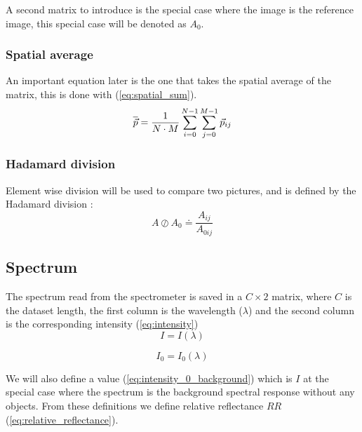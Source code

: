 A second matrix to introduce is the special case where the image is the reference image, this special case will be denoted as $A_0$.

\subsubsection{Spatial average}
\label{sec:spatial_average}

An important equation later is the one that takes the spatial average of the matrix, this is done with (\ref{eq:spatial_sum}).
\begin{equation}
    \label{eq:spatial_sum}
    \overline{\vec{p}} = \frac{1}{N \cdot M} \sum_{i=0}^{N-1} \sum_{j=0}^{M-1} \vec{p}_{ij}
\end{equation}


\subsubsection{Hadamard division}
Element wise division will be used to compare two pictures, and is defined by the Hadamard division \cite{HadamardDivisionInfixed}:
\begin{equation}
    \label{eq:element_wise_division_image}
    A \oslash  A_0 \doteq  \frac{A_{ij}}{A_{0ij} } %
\end{equation}


\subsection{Spectrum}
\label{sec:spectrum}

The spectrum read from the spectrometer is saved in a $C \times 2$ matrix, where $C$ is the dataset length, the first column is the wavelength ($\lambda$) and the second column is the corresponding intensity (\ref{eq:intensity})
\begin{equation}
    \label{eq:intensity}
    I = I(\lambda)    
\end{equation}

\begin{equation}
    \label{eq:intensity_0_background}
    I_0 = I_0(\lambda)
\end{equation}

We will also define a value (\ref{eq:intensity_0_background}) which is $I$ at the special case where the spectrum is the background spectral response without any objects. From these definitions we define relative reflectance $RR$ (\ref{eq:relative_reflectance}). 

